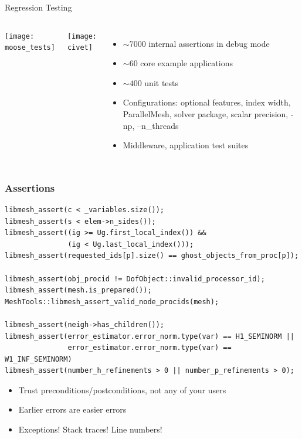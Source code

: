 \documentclass[mathserif]{beamer}
\begin{document}
\begin{frame}[t]{Regression Testing}
  \begin{columns}
    \texttt{[image: moose\_tests]}

    \texttt{[image: civet]}
    \begin{itemize}
    \item $\sim 7000$ internal assertions in debug mode
    \item $\sim 60$ core example applications 
    \item $\sim 400$ unit tests
    \item Configurations: optional features, index width, ParallelMesh,
                          solver package, scalar precision, -np, --n\_threads
    \item Middleware, application test suites
    \end{itemize}
  \end{columns}
\end{frame}


\begin{frame}[fragile]
\frametitle{Assertions}
{\footnotesize
\begin{verbatim}
libmesh_assert(c < _variables.size());
libmesh_assert(s < elem->n_sides());
libmesh_assert((ig >= Ug.first_local_index()) &&
               (ig < Ug.last_local_index()));
libmesh_assert(requested_ids[p].size() == ghost_objects_from_proc[p]);

libmesh_assert(obj_procid != DofObject::invalid_processor_id);
libmesh_assert(mesh.is_prepared());
MeshTools::libmesh_assert_valid_node_procids(mesh);

libmesh_assert(neigh->has_children());
libmesh_assert(error_estimator.error_norm.type(var) == H1_SEMINORM ||
               error_estimator.error_norm.type(var) == W1_INF_SEMINORM)
libmesh_assert(number_h_refinements > 0 || number_p_refinements > 0);
\end{verbatim}
}

\pause

\begin{itemize}[<+->]
\item Trust preconditions/postconditions, not any of your users
\item Earlier errors are easier errors
\item Exceptions!  Stack traces!  Line numbers!
\end{itemize}

\end{frame}
\end{document}

